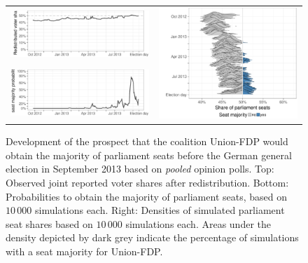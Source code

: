 \documentclass[smallcondensed]{svjour3}     %
\begin{document}
\begin{figure}[H]\centering
\begin{tabular}{ll}
\includegraphics[height=.15\textwidth]{figures/2013_pooled_cdufdp_rawSharesRedist.pdf}
&
\multirow{2}{*}[13ex]{\includegraphics[height=.3\textwidth]{figures/2013_pooled_cdufdp_ridgeline.pdf}}
\\
\includegraphics[height=.15\textwidth]{figures/2013_pooled_cdufdp_prob.pdf}
\end{tabular}
\caption{Development of the prospect that the coalition Union-FDP would obtain
the majority of parliament seats before the German general election in September
2013 based on \emph{pooled} opinion polls. Top: Observed joint reported voter shares after
redistribution. Bottom: Probabilities to obtain the majority of parliament seats,
based on $10\,000$ simulations each.
Right: Densities of simulated parliament seat shares based on $10\,000$ simulations each.
Areas under the density depicted by dark grey indicate the percentage of
simulations with a seat majority for Union-FDP.
\label{fig:2013_cdufdp}
}
\end{figure}
\end{document}
